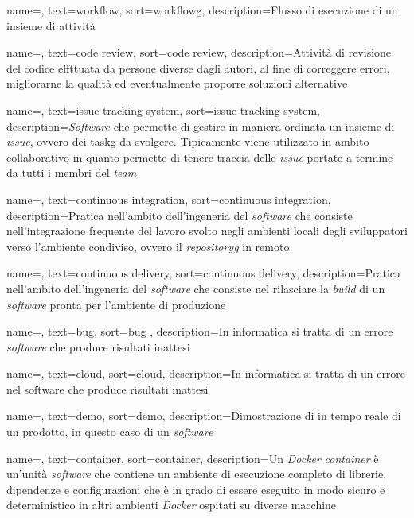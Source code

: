 {
    name=,
    text=workflow,
    sort=workflowg,
    description={Flusso di esecuzione di un insieme di attività}
}

{
    name=,
    text=code review,
    sort=code review,
    description={Attività di revisione del codice effttuata da persone diverse dagli autori, al fine di correggere errori, migliorarne la qualità ed eventualmente proporre soluzioni alternative}
}

{
    name=,
    text=issue tracking system,
    sort=issue tracking system,
    description={\textit{Software} che permette di gestire in maniera ordinata un insieme di \textit{issue}, ovvero dei \gls{taskg} da svolgere. Tipicamente viene utilizzato in ambito collaborativo in quanto permette di tenere traccia delle \textit{issue} portate a termine da tutti i membri del \textit{team}}
}

{
    name=,
    text=continuous integration,
    sort=continuous integration,
    description={Pratica nell'ambito dell'ingeneria del \textit{software} che consiste nell'integrazione frequente del lavoro svolto negli ambienti locali degli sviluppatori verso l'ambiente condiviso, ovvero il \textit{\gls{repositoryg}} in remoto}
}

{
    name=,
    text=continuous delivery,
    sort=continuous delivery,
    description={Pratica nell'ambito dell'ingeneria del \textit{software} che consiste nel rilasciare la \textit{build} di un \textit{software} pronta per l'ambiente di produzione}
}

{
    name=,
    text=bug,
    sort=bug ,
    description={In informatica si tratta di un errore \textit{software} che produce risultati inattesi}
}

{
    name=,
    text=cloud,
    sort=cloud,
    description={In informatica si tratta di un errore nel software che produce risultati inattesi}
}

{
    name=,
    text=demo,
    sort=demo,
    description={Dimostrazione di in tempo reale di un prodotto, in questo caso di un \textit{software}}
}

{
    name=,
    text=container,
    sort=container,
    description={Un \textit{Docker} \textit{container} è un'unità \textit{software} che contiene un ambiente di esecuzione completo di librerie, dipendenze e configurazioni che è in grado di essere eseguito in modo sicuro e deterministico in altri ambienti \textit{Docker} ospitati su diverse macchine}
}


